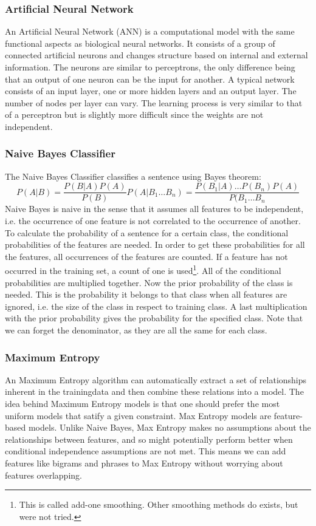 \documentclass[11pt]{article}
\begin{document}
\subsubsection{Artificial Neural Network}
An Artificial Neural Network (ANN) is a computational model with the same functional aspects as biological neural networks. It consists of a group of connected artificial neurons and changes structure based on internal and external information. The neurons are similar to perceptrons, the only difference being that an output of one neuron can be the input for another. A typical network consists of an input layer, one or more hidden layers and an output layer. The number of nodes per layer can vary. The learning process is very similar to that of a perceptron but is slightly more difficult since the weights are not independent.
\subsubsection{Naive Bayes Classifier}
The Naive Bayes Classifier classifies a sentence using Bayes theorem:
\begin{equation}
P(A|B) = \frac{P(B|A)P(A)}{P(B)}
P(A|B_1 \dots B_n) = \frac{P(B_1|A)\dots P(B_n) P(A)} { P(B_1 \dots B_n }
\end{equation}
Naive Bayes is naive in the sense that it assumes all features to be independent, i.e. the occurrence of one feature is not correlated to the occurrence of another.
To calculate the probability of a sentence for a certain class, the conditional probabilities of the features are needed. In order to get these probabilities for all the features, all occurrences of the features are counted. If a feature has not occurred in the training set, a count of one is used\footnote{This is called add-one smoothing. Other smoothing methods do exists, but were not tried.}.
All of the conditional probabilities are multiplied together. Now the prior probability of the class is needed. This is the probability it belongs to that class when all features are ignored, i.e. the size of the class in respect to training class. A last multiplication with the prior probability gives the probability for the specified class. Note that we can forget the denominator, as they are all the same for each class.
\subsubsection{Maximum Entropy}
An Maximum Entropy algorithm can automatically extract a set of relationships inherent in the trainingdata and then combine these relations into a model. The idea behind Maximum Entropy models is that one should prefer the most uniform models that satify a given constraint. Max Entropy models are feature-based models. Unlike Naive Bayes, Max Entropy makes no assumptions about the relationships between features, and so might potentially perform better when conditional independence assumptions are not met. This means we can add features like bigrams and phrases to Max Entropy without worrying about features overlapping.
\end{document}
